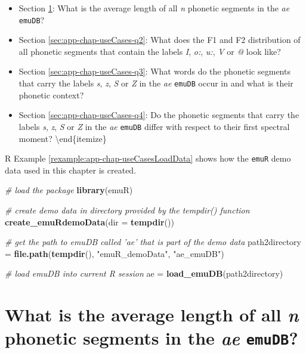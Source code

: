 \documentclass[]{book}
\newenvironment{Shaded}{\begin{snugshade}}{\end{snugshade}}
\newcommand{\CommentTok}[1]{\textcolor[rgb]{0.56,0.35,0.01}{\textit{#1}}}
\newcommand{\DataTypeTok}[1]{\textcolor[rgb]{0.13,0.29,0.53}{#1}}
\newcommand{\KeywordTok}[1]{\textcolor[rgb]{0.13,0.29,0.53}{\textbf{#1}}}
\newcommand{\NormalTok}[1]{#1}
\newcommand{\StringTok}[1]{\textcolor[rgb]{0.31,0.60,0.02}{#1}}
\providecommand{\tightlist}{%
  \setlength{\itemsep}{0pt}\setlength{\parskip}{0pt}}
\theoremstyle{definition}
\theoremstyle{definition}
\theoremstyle{definition}
\theoremstyle{remark}
\begin{document}
\begin{itemize}
\tightlist
\item
  Section \ref{sec:app-chap-useCases-q1}: What is the average length of
  all \emph{n} phonetic segments in the \emph{ae} \texttt{emuDB}?
\item
  Section \ref{sec:app-chap-useCases-q2}: What does the F1 and F2
  distribution of all phonetic segments that contain the labels
  \emph{I}, \emph{o:}, \emph{u:}, \emph{V} or \emph{@} look like?
\item
  Section \ref{sec:app-chap-useCases-q3}: What words do the phonetic
  segments that carry the labels \emph{s}, \emph{z}, \emph{S} or
  \emph{Z} in the \emph{ae} \texttt{emuDB} occur in and what is their
  phonetic context?
\item
  Section \ref{sec:app-chap-useCases-q4}: Do the phonetic segments that
  carry the labels \emph{s}, \emph{z}, \emph{S} or \emph{Z} in the
  \emph{ae} \texttt{emuDB} differ with respect to their first spectral
  moment? \textbackslash{}end\{itemize\}
\end{itemize}

R Example \ref{rexample:app-chap-useCasesLoadData} shows how the
\texttt{emuR} demo data used in this chapter is created.

\begin{Shaded}
\begin{Highlighting}[]
\CommentTok{# load the package }
\KeywordTok{library}\NormalTok{(emuR)}

\CommentTok{# create demo data in directory provided by the tempdir() function}
\KeywordTok{create_emuRdemoData}\NormalTok{(}\DataTypeTok{dir =} \KeywordTok{tempdir}\NormalTok{())}

\CommentTok{# get the path to emuDB called 'ae' that is part of the demo data}
\NormalTok{path2directory =}\StringTok{ }\KeywordTok{file.path}\NormalTok{(}\KeywordTok{tempdir}\NormalTok{(), }\StringTok{"emuR_demoData"}\NormalTok{, }\StringTok{"ae_emuDB"}\NormalTok{)}

\CommentTok{# load emuDB into current R session}
\NormalTok{ae =}\StringTok{ }\KeywordTok{load_emuDB}\NormalTok{(path2directory)}
\end{Highlighting}
\end{Shaded}

\hypertarget{sec:app-chap-useCases-q1}{%
\section{\texorpdfstring{What is the average length of all \emph{n}
phonetic segments in the \emph{ae}
\texttt{emuDB}?}{What is the average length of all n phonetic segments in the ae emuDB?}}\label{sec:app-chap-useCases-q1}}
\end{document}
